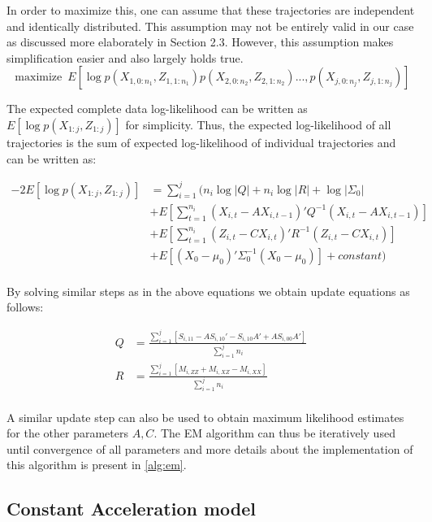 \documentclass{article}
\DeclareMathOperator*{\maximize}{maximize}
\begin{document}
In order to maximize this, one can assume that these trajectories are independent and identically distributed. This assumption may not be entirely valid in our case as discussed more elaborately in Section 2.3. However, this assumption makes simplification easier and also largely holds true. 
$$\maximize \ E[\log p(X_{1,0:n_1},Z_{1,1:n_1})p(X_{2,0:n_2},Z_{2,1:n_2})...,p(X_{j,0:n_j},Z_{j,1:n_j})] $$

The expected complete data log-likelihood can be written as $E[\log p(X_{1:j},Z_{1:j})]$ for simplicity. Thus, the expected log-likelihood of all trajectories is the sum of expected log-likelihood of individual trajectories and can be written as:

\begin{equation}
\begin{split}
     -2E[\log p(X_{1:j},Z_{1:j})] &=\sum_{i=1}^j (n_i\log |Q|+n_i\log|R| + \log|\Sigma_0|\\
     &+ E[\sum_{t=1}^{n_i}(X_{i,t}-AX_{i,t-1})'Q^{-1}(X_{i,t}-AX_{i,t-1})] \\ 
 &+ E[\sum_{t=1}^{n_i}(Z_{i,t}-CX_{i,t})'R^{-1}(Z_{i,t}-CX_{i,t})]\\
 &+ E[(X_0-\mu_0)'\Sigma_0^{-1}(X_0-\mu_0)] +constant)\\
\end{split}
\end{equation}

By solving similar steps as in the above equations we obtain update equations as follows:

\begin{equation}
\begin{split}
 Q&=  \frac{\sum_{i=1}^{j}[S_{i,11}-AS_{i,10}'-S_{i,10}A'+AS_{i,00}A']}{\sum_{i=1}^{j}n_i}\\
 R&= \frac{\sum_{i=1}^{j}[M_{i,ZZ}+M_{i,XZ}-M_{i,XX}]}{\sum_{i=1}^{j}n_i}\\
\end{split}
\end{equation}

A similar update step can also be used to obtain maximum likelihood estimates for the other parameters $A,C$. The EM algorithm can thus be iteratively used until convergence of all parameters and more details about the implementation of this algorithm is present in \ref{alg:em}. 


\subsection{Constant Acceleration model}
\end{document}
